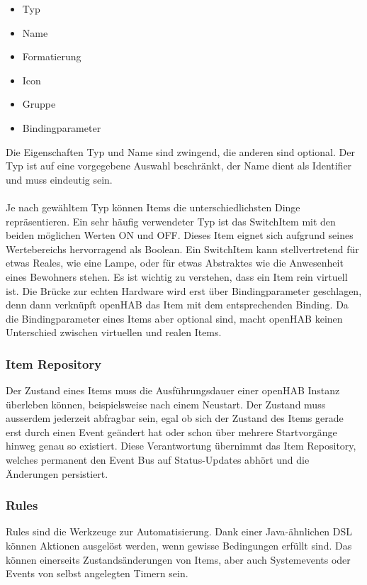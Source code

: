 \begin{itemize}
	\item Typ
	\item Name
	\item Formatierung
	\item Icon
	\item Gruppe
	\item Bindingparameter
\end{itemize}

Die Eigenschaften Typ und Name sind zwingend, die anderen sind optional. Der Typ ist auf eine vorgegebene Auswahl beschränkt, der Name dient als Identifier und muss eindeutig sein.\\
\\
Je nach gewähltem Typ können Items die unterschiedlichsten Dinge repräsentieren. Ein sehr häufig verwendeter Typ ist das SwitchItem mit den beiden möglichen Werten ON und OFF. Dieses Item eignet sich aufgrund seines Wertebereichs hervorragend als Boolean. Ein SwitchItem kann stellvertretend für etwas Reales, wie eine Lampe, oder für etwas Abstraktes wie die Anwesenheit eines Bewohners stehen. Es ist wichtig zu verstehen, dass ein Item rein virtuell ist. Die Brücke zur echten Hardware wird erst über Bindingparameter geschlagen, denn dann verknüpft openHAB das Item mit dem entsprechenden Binding. Da die Bindingparameter eines Items aber optional sind, macht openHAB keinen Unterschied zwischen virtuellen und realen Items.


\subsubsection{Item Repository}
Der Zustand eines Items muss die Ausführungsdauer einer openHAB Instanz überleben können, beispielsweise nach einem Neustart. Der Zustand muss ausserdem jederzeit abfragbar sein, egal ob sich der Zustand des Items gerade erst durch einen Event geändert hat oder schon über mehrere Startvorgänge hinweg genau so existiert. Diese Verantwortung übernimmt das Item Repository, welches permanent den Event Bus auf Status-Updates abhört und die Änderungen persistiert.

\subsubsection{Rules}
Rules sind die Werkzeuge zur Automatisierung. Dank einer Java-ähnlichen DSL können Aktionen ausgelöst werden, wenn gewisse Bedingungen erfüllt sind. Das können einerseits Zustandsänderungen von Items, aber auch Systemevents oder Events von selbst angelegten Timern sein. 

